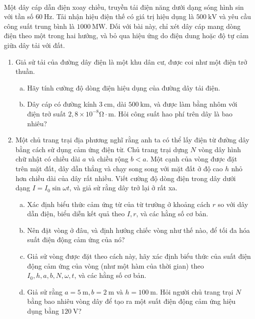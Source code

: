 \begin{vd}\\%
Một dây cáp dẫn điện xoay chiều, truyền tải điện năng dưới dạng sóng hình sin với tần số $60~\mathrm{Hz}$. Tải nhận hiệu điện thế có giá trị hiệu dụng là $500~\mathrm{kV}$ và yêu cầu công suất trung bình là $1000~\mathrm{MW}$. Đối với bài này, chỉ xét dây cáp mang dòng điện theo một trong hai hướng, và bỏ qua hiệu ứng do điện dung hoặc độ tự cảm giữa dây tải với đất.
\begin{enumerate}[1.]
    \item Giả sử tải của đường dây điện là một khu dân cư, được coi như một điện trở thuần.
    \begin{enumerate}[a.]
        \item Hãy tính cường độ dòng điện hiệu dụng của đường dây tải điện.
        \item Dây cáp có đường kính $3~\mathrm{cm}$, dài $500~\mathrm{km}$, và được làm bằng nhôm với điện trở suất $2,8\times10^{-8}\mathrm{\Omega\cdot m}$. Hỏi công suất hao phí trên dây là bao nhiêu?
    \end{enumerate}
    \item Một chủ trang trại địa phương nghĩ rằng anh ta có thể lấy điện từ đường dây bằng cách sử dụng cảm ứng điện từ. Chủ trang trại dựng $N$ vòng dây hình chữ nhật có chiều dài $a$ và chiều rộng $b<a$. Một cạnh của vòng được đặt trên mặt đất, dây dẫn thẳng và chạy song song với mặt đất ở độ cao $h$ nhỏ hơn chiều dài của dây rất nhiều. Viết cường độ dòng điện trong dây dưới dạng $I=I_0\sin \omega t$, và giả sử rằng dây trở lại ở rất xa.
    \begin{enumerate}[a.]
        \item Xác định biểu thức cảm ứng từ của từ trường ở khoảng cách $r$ so với dây dẫn điện, biểu diễn kết quả theo $I, r$, và các hằng số cơ bản.
        \item Nên đặt vòng ở đâu, và định hướng chiếc vòng như thế nào, để tối đa hóa suất điện động cảm ứng của nó?
        \item Giả sử vòng được đặt theo cách này, hãy xác định biểu thức của suất điện động cảm ứng của vòng (như một hàm của thời gian) theo $I_0, h, a, b, N, \omega, t$, và các hằng số cơ bản.
        \item Giả sử rằng $a=5~\mathrm{m}, b=2~\mathrm{m}$ và $h=100~\mathrm{m}$. Hỏi người chủ trang trại $N$ bằng bao nhiêu vòng dây để tạo ra một suất điện động cảm ứng hiệu dụng bằng $120~\mathrm{V}$?
    \end{enumerate}

\end{enumerate}
\end{vd}
